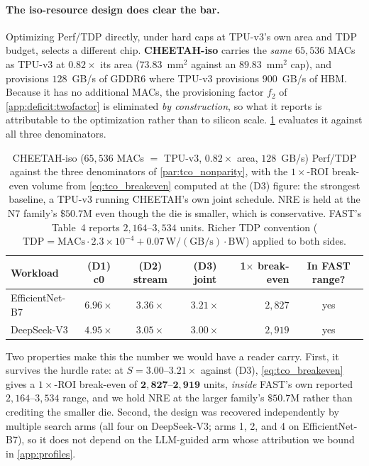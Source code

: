 \paragraph{The iso-resource design does clear the bar.}
\label{par:tco_iso}
Optimizing Perf/TDP directly, under hard caps at TPU-v3's own area and TDP
budget, selects a different chip. \textbf{CHEETAH-iso} carries the \emph{same}
$65{,}536$ MACs as TPU-v3 at $0.82\times$ its area ($73.83$~mm$^2$ against an
$89.83$~mm$^2$ cap), and provisions $128$~GB/s of GDDR6 where TPU-v3 provisions
$900$~GB/s of HBM. Because it has no additional MACs, the provisioning factor
$f_2$ of \cref{app:deficit:twofactor} is eliminated \emph{by construction}, so
what it reports is attributable to the optimization rather than to silicon
scale. \cref{tab:tco_iso} evaluates it against all three denominators.

\begin{table}[t]
\centering
\small
\caption{CHEETAH-iso ($65{,}536$ MACs $=$ TPU-v3, $0.82\times$ area, $128$~GB/s)
Perf/TDP against the three denominators of \cref{par:tco_nonparity}, with the
$1\times$-ROI break-even volume from \cref{eq:tco_breakeven} computed at the
(D3) figure: the strongest baseline, a TPU-v3 running CHEETAH's own joint
schedule. NRE is held at the N7 family's $\$50.7\mathrm{M}$ even though the die
is smaller, which is conservative. FAST's Table~4 reports $2{,}164\text{--}3{,}534$
units. Richer TDP convention ($\mathrm{TDP}=\mathrm{MACs}\cdot2.3\!\times\!10^{-4}
+0.07\,\mathrm{W}/(\mathrm{GB/s})\cdot\mathrm{BW}$) applied to both sides.}
\label{tab:tco_iso}
\begin{tabular}{@{}lcccrc@{}}
\toprule
\textbf{Workload} & \textbf{(D1) c0} & \textbf{(D2) stream} &
\textbf{(D3) joint} & \textbf{1$\times$ break-even} & \textbf{In FAST range?} \\
\midrule
EfficientNet-B7 & $6.96\times$ & $3.36\times$ & $\mathbf{3.21\times}$ & $2{,}827$ & yes \\
DeepSeek-V3     & $4.95\times$ & $3.05\times$ & $\mathbf{3.00\times}$ & $2{,}919$ & yes \\
\bottomrule
\end{tabular}
\end{table}

Two properties make this the number we would have a reader carry. First, it
survives the hurdle rate: at $S=3.00\text{--}3.21\times$ against (D3),
\cref{eq:tco_breakeven} gives a $1\times$-ROI break-even of
$\mathbf{2{,}827\text{--}2{,}919}$ units, \emph{inside} FAST's own reported
$2{,}164\text{--}3{,}534$ range, and we hold NRE at the larger family's
$\$50.7\mathrm{M}$ rather than crediting the smaller die. Second, the design was
recovered independently by multiple search arms (all four on DeepSeek-V3; arms
1, 2, and 4 on EfficientNet-B7), so it does not depend on the LLM-guided arm
whose attribution we bound in \cref{app:profiles}.

